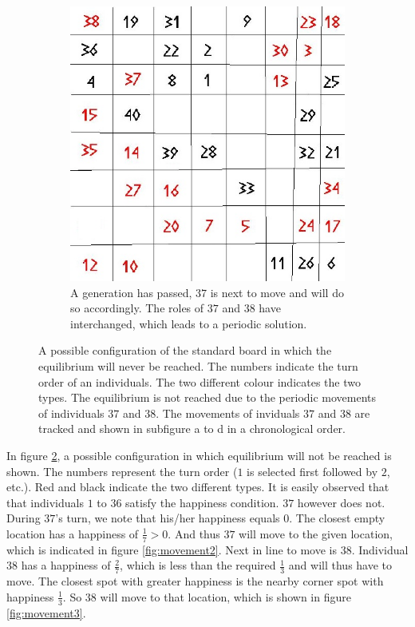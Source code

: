 \begin{figure}[H]
\begin{subfigure}{0.3\textwidth}
        \includegraphics[width=\textwidth]{Tegenvoorbeeld/segregation_tegenvb_3.jpg}
        \caption{A generation has passed, $37$ is next to move and will do so accordingly. The roles of  $37$ and $38$ have interchanged, which leads to a periodic solution. }
        \label{fig:movement4}
    \end{subfigure}
    \caption{A possible configuration of the standard board in which the equilibrium will never be reached. The numbers indicate the turn order of an individuals. The two different colour indicates the two types. The equilibrium is not reached due to the periodic movements of individuals $37$ and $38$. The movements of inviduals $37$ and $38$ are tracked and shown in subfigure a to d in a chronological order.}\label{fig:equilibrium counterexample}
\end{figure}

In figure \ref{fig:equilibrium counterexample}, a possible configuration in which  equilibrium will not be reached is shown. 
The numbers represent the turn order ($1$ is selected first followed by $2$, etc.). 
Red and black indicate  the two different types. It is easily observed that that individuals $1$ to $36$ satisfy the happiness condition. $37$ however does not. 
During $37$'s turn, we note that his/her happiness equals $0$. 
The closest empty location has a happiness of $\frac{1}{7} > 0$. 
And thus $37$ will move to the given location, which is indicated in figure \ref{fig:movement2}.
Next in line to move is $38$. 
Individual $38$ has a happiness of $\frac{2}{7}$, which is less than the required $\frac{1}{3}$ and will thus have to move. 
The closest spot with greater happiness is the nearby corner spot with happiness $\frac{1}{3}$. 
So $38$ will move to that location, which is shown in figure \ref{fig:movement3}.\\

